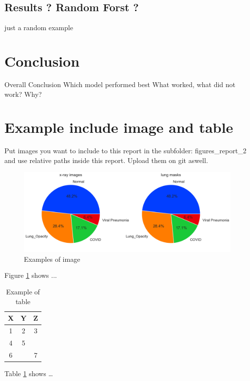 \documentclass{article}
\begin{document}
\subsection{Results ? Random Forst ?}
just a random example

\section{Conclusion}
Overall Conclusion
Which model performed best
What worked, what did not work? Why?

\section{Example include image and table}

Put images you want to include to this report in the subfolder: figures\_report\_2 and use relative paths inside this report.
Upload them on git aswell.

\begin{figure}[h!] %
    \centering
    \includegraphics[width=1.0\linewidth]{../figures/figures_report_2/classes.png}
    \caption{Examples of image}
    \label{fig:example_image}
\end{figure}

Figure \ref{fig:example_image} shows ...


\begin{table}[h]
    \centering
    \begin{tabular}{|c|c|c|}
        \hline
        \textbf{X} & \textbf{Y} & \textbf{Z} \\ \hline
        1 & 2 & 3 \\ \hline
        4 & 5 &  \\ \hline \hline
        6 &  & 7 \\ \hline
    \end{tabular}
    \caption{Example of table}
    \label{tab:example_table}
\end{table}

Table \ref{tab:example_table} shows \dots
\end{document}
